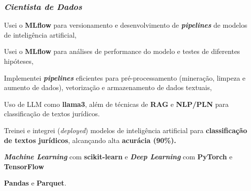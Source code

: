 \documentclass[a4paper,12pt]{article}
\begin{document}
\subsubsection*{\normalsize \textit{Cientista de Dados}}
\vspace{-1.3em}
\vspace{-0.5em}
\begin{zitemize}
    \item Usei o \textbf{MLflow} para versionamento e desenvolvimento de  \textbf{\textit{pipelines}} de modelos de inteligência artificial,
    \item Usei o \textbf{MLflow} para análises de performance do modelo e testes de diferentes hipóteses,
    \item Implementei \textbf{\textit{pipelines}} eficientes para pré-processamento (mineração, limpeza e aumento de dados), vetorização e armazenamento de dados textuais,
    \item Uso de LLM como \textbf{llama3}, além de técnicas de \textbf{RAG} e \textbf{NLP/PLN} para classificação de textos jurídicos.
    \item Treinei e integrei (\textit{deployed}) modelos de inteligência artificial para \textbf{classificação de textos jurídicos}, alcançando alta \textbf{acurácia (90\%).}
    \item \textbf{\textit{Machine Learning}} com \textbf{ scikit-learn} e \textbf{\textit{Deep Learning}} com \textbf{PyTorch} e  \textbf{TensorFlow}
    \item \textbf{Pandas} e \textbf{Parquet}.
\end{zitemize}

%
%
\end{document}
